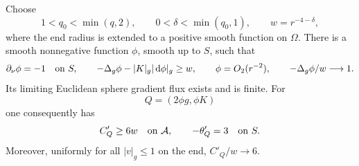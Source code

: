 \begin{lemma}
\label{rig4:var:strict-direction}
Choose
\[
 1<q_0<\min(q,2),\qquad 0<\delta<\min(q_0,1),
 \qquad w=r^{-4-\delta},
\]
where the end radius is extended to a positive smooth function on $\Omega$.
There is a smooth nonnegative function $\phi$, smooth up to $S$, such that
\begin{equation}
 \partial_\nu\phi=-1\quad\hbox{on }S,\qquad
 -\Delta_g\phi-|K|_g|\,\mathrm d\phi|_g\ge w,\qquad
 \phi=O_2(r^{-2}),\qquad -\Delta_g\phi/w\longrightarrow1.
\label{rig4:var:phi-properties}
\end{equation}
Its limiting Euclidean sphere gradient flux exists and is finite.
For
\[
 Q=(2\phi g,\phi K)
\]
one consequently has
\begin{equation}
 C'_Q\ge6w\quad\hbox{on }\mathcal A,
 \qquad -\theta'_Q=3\quad\hbox{on }S.
\label{rig4:var:strict-derivatives}
\end{equation}
Moreover, uniformly for all $|v|_g\le1$ on the end,
$C'_Q/w\longrightarrow6$.
\end{lemma}

